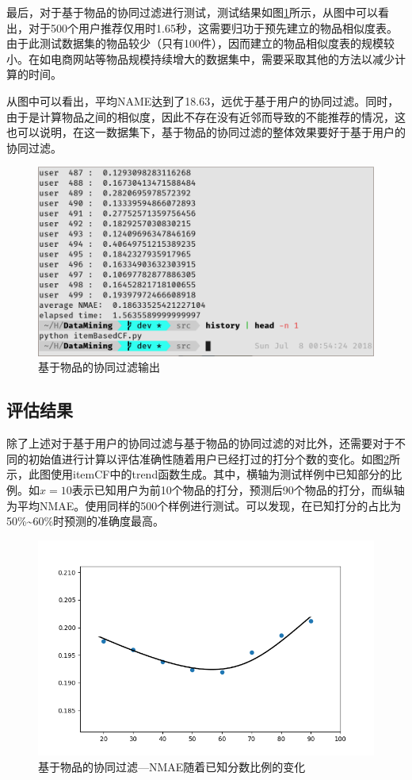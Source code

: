 \documentclass{article}
\begin{document}
\par 最后，对于基于物品的协同过滤进行测试，测试结果如图\ref{fig:itemOutput1}所示，从图中可以看出，对于500个用户推荐仅用时1.65秒，这需要归功于预先建立的物品相似度表。由于此测试数据集的物品较少（只有100件），因而建立的物品相似度表的规模较小。在如电商网站等物品规模持续增大的数据集中，需要采取其他的方法以减少计算的时间。
\par 从图中可以看出，平均NAME达到了18.63，远优于基于用户的协同过滤。同时，由于是计算物品之间的相似度，因此不存在没有近邻而导致的不能推荐的情况，这也可以说明，在这一数据集下，基于物品的协同过滤的整体效果要好于基于用户的协同过滤。

\begin{figure}[H]
    \centering
    \includegraphics[width=0.9\linewidth]{itemOutput1.png}
    \caption{基于物品的协同过滤输出}
    \label{fig:itemOutput1}
\end{figure}

\subsection{评估结果}
\label{sub:ping_gu_jie_guo_}
\par 除了上述对于基于用户的协同过滤与基于物品的协同过滤的对比外，还需要对于不同的初始值进行计算以评估准确性随着用户已经打过的打分个数的变化。如图\ref{fig:trend}所示，此图使用itemCF中的trend函数生成。其中，横轴为测试样例中已知部分的比例。如\(x=10\)表示已知用户为前10个物品的打分，预测后90个物品的打分，而纵轴为平均NMAE。使用同样的500个样例进行测试。可以发现，在已知打分的占比为50\%\textasciitilde 60\%时预测的准确度最高。

\begin{figure}[htpb]
    \centering
    \includegraphics[width=0.9\linewidth]{trend.png}
    \caption{基于物品的协同过滤---NMAE随着已知分数比例的变化}
    \label{fig:trend}
\end{figure}
\end{document}
